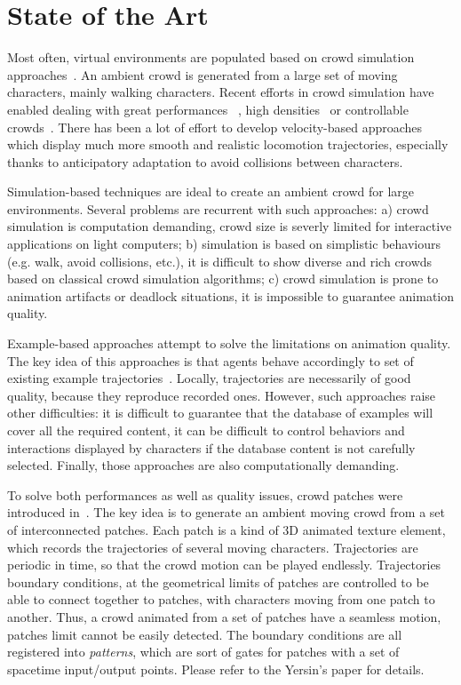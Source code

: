\section{State of the Art \label{state_of_the_art}}
\label{sec:star}

Most often, virtual environments are populated based on crowd simulation approaches~\cite{ThalmannBook:2013}. An ambient crowd is generated from a large set of moving characters, mainly walking characters. Recent efforts in crowd simulation have enabled dealing with great performances ~\cite{PettreCAVW:2006,Treuille:2006}, high densities~\cite{Narain:2009} or controllable crowds~\cite{Guy:2009}. There has been a lot of effort to develop velocity-based approaches~\cite{Paris:2007,VanDenBerg:2008} which display much more smooth and realistic locomotion trajectories, especially thanks to anticipatory adaptation to avoid collisions between characters. 

Simulation-based techniques are ideal to create an ambient crowd for large environments. Several problems are recurrent with such approaches: a) crowd simulation is computation demanding, crowd size is severly limited for interactive applications on light computers; b) simulation is based on simplistic behaviours (e.g. walk, avoid collisions, etc.), it is difficult to show diverse and rich crowds based on classical crowd simulation algorithms; c) crowd simulation is prone to animation artifacts or deadlock situations, it is impossible to guarantee animation quality. 

Example-based approaches attempt to solve the limitations on animation quality. The key idea of this approaches is that agents behave accordingly to set of existing example trajectories~\cite{Lerner:2007,Ju:2010,Charalambous:2014}. Locally, trajectories are necessarily of good quality, because they reproduce recorded ones. However, such approaches raise other difficulties: it is difficult to guarantee that the database of examples will cover all the required content, it can be difficult to control behaviors and interactions displayed by characters if the database content is not carefully selected. Finally, those approaches are also computationally demanding.

To solve both performances as well as quality issues, crowd patches were introduced in~\cite{Yersin:2009}. The key idea is to generate an ambient moving crowd from a set of interconnected patches. Each patch is a kind of 3D animated texture element, which records the trajectories of several moving characters. Trajectories are periodic in time, so that the crowd motion can be played endlessly. Trajectories boundary conditions, at the geometrical limits of patches are controlled to be able to connect together to patches, with characters moving from one patch to another. Thus, a crowd animated from a set of patches have a seamless motion, patches limit cannot be easily detected. The boundary conditions are all registered into {\it patterns}, which are sort of gates for patches with a set of spacetime input/output points. Please refer to the Yersin's paper for details. 

